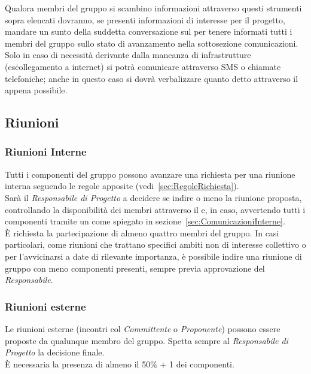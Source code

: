 \documentclass{scalatekids-article}
\begin{document}
Qualora membri del gruppo si scambino informazioni attraverso questi strumenti
sopra elencati dovranno, se presenti informazioni di interesse per il progetto,
mandare un sunto della suddetta conversazione sul  per tenere
informati tutti i membri del gruppo sullo stato di avanzamento nella
sottosezione comunicazioni.\\ Solo in caso di necessità derivante dalla mancanza
di infrastrutture (es\. collegamento a internet) si potrà comunicare attraverso
SMS o chiamate telefoniche; anche in questo caso si dovrà verbalizzare quanto
detto attraverso il  appena possibile.

\subsection{Riunioni}

\subsubsection{Riunioni Interne}

Tutti i componenti del gruppo possono avanzare una richiesta per una riunione
interna seguendo le regole apposite (vedi~\ref{sec:RegoleRichiesta}).\\
Sarà il \textit{Responsabile di Progetto} a decidere se indire
o meno la riunione proposta, controllando la disponibilità dei membri attraverso il
 e, in caso, avvertendo tutti i componenti tramite un  come
spiegato in sezione~\ref{sec:ComunicazioniInterne}.\\ È richiesta la partecipazione di
almeno quattro membri del gruppo. In casi particolari, come riunioni che
trattano specifici ambiti non di interesse collettivo o per l'avvicinarsi
a date di rilevante importanza, è possibile indire una riunione di gruppo con meno componenti
presenti, sempre previa approvazione del \textit{Responsabile}.

\subsubsection{Riunioni esterne}

Le riunioni esterne (incontri col \textit{Committente} o \textit{Proponente}) possono essere
proposte da qualunque membro del gruppo. Spetta sempre al \textit{Responsabile
di Progetto} la decisione finale.\\ È necessaria la presenza di almeno il
50\% + 1 dei componenti.
\end{document}
